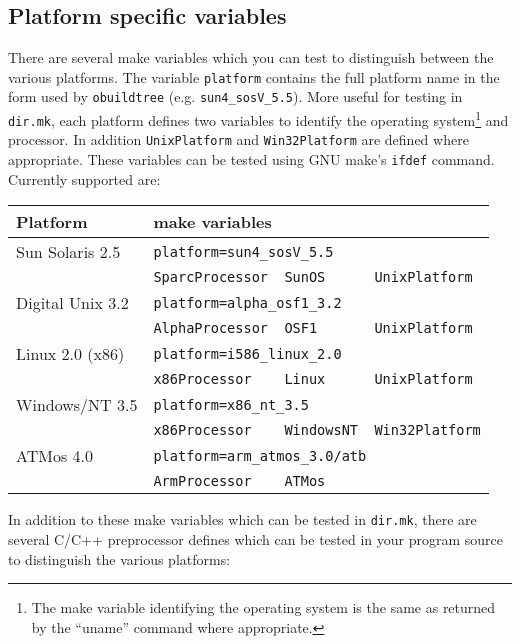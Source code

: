 \documentclass[11pt,twoside,onecolumn]{article}
\begin{document}
\subsection{Platform specific variables}

There are several make variables which you can test to distinguish between the
various platforms.  The variable {\tt platform} contains the full platform name
in the form used by {\tt obuildtree} (e.g. \verb|sun4_sosV_5.5|).  More useful
for testing in {\tt dir.mk}, each platform defines two variables to identify
the operating system\footnote{The make variable identifying the operating
system is the same as returned by the ``uname'' command where appropriate.} and
processor.  In addition {\tt UnixPlatform} and {\tt Win32Platform} are defined
where appropriate.  These variables can be tested using GNU make's {\tt ifdef}
command.  Currently supported are:

\begin{flushleft}
\begin{tabular}{|l|l|}
\hline
Platform & make variables \\
\hline
Sun Solaris 2.5  & \verb|platform=sun4_sosV_5.5| \\
                 & \verb|SparcProcessor  SunOS      UnixPlatform| \\
\hline
Digital Unix 3.2 & \verb|platform=alpha_osf1_3.2| \\
                 & \verb|AlphaProcessor  OSF1       UnixPlatform| \\
\hline
Linux 2.0 (x86)  & \verb|platform=i586_linux_2.0| \\
                 & \verb|x86Processor    Linux      UnixPlatform| \\
\hline
Windows/NT 3.5   & \verb|platform=x86_nt_3.5| \\
                 & \verb|x86Processor    WindowsNT  Win32Platform| \\
\hline
ATMos 4.0        & \verb|platform=arm_atmos_3.0/atb| \\
                 & \verb|ArmProcessor    ATMos| \\
\hline
\end{tabular}
\end{flushleft}

In addition to these make variables which can be tested in {\tt dir.mk}, there
are several C/C++ preprocessor defines which can be tested in your program
source to distinguish the various platforms:
\end{document}
